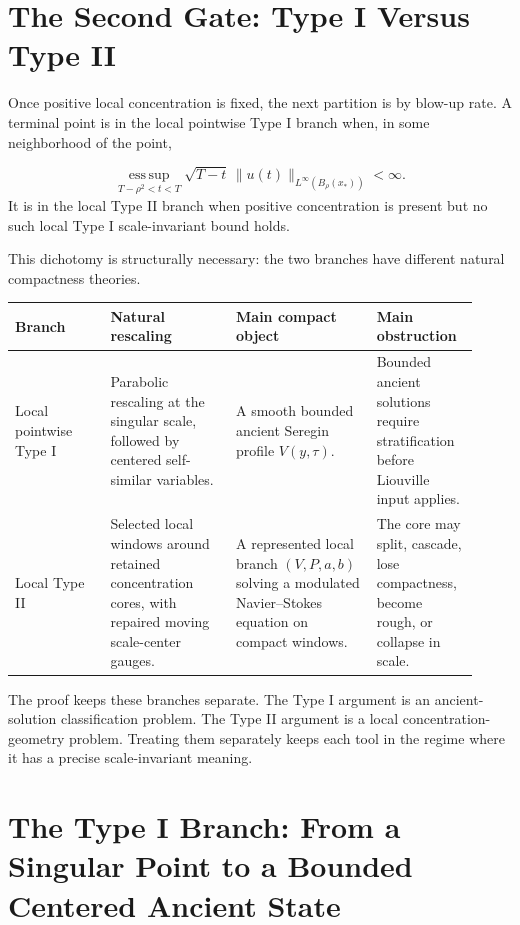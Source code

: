 \documentclass[11pt]{amsart}
\begin{document}
\section{The Second Gate: Type I Versus Type II}

Once positive local concentration is fixed, the next partition is by blow-up rate.  A terminal point is in the local pointwise Type I branch when, in some neighborhood of the point,

\[
  \operatorname*{ess\,sup}_{T-\rho^2<t<T}
  \sqrt{T-t}\,\|u(t)\|_{L^\infty(B_\rho(x_*))}<\infty .
\]
It is in the local Type II branch when positive concentration is present but no such local Type I scale-invariant bound holds.

This dichotomy is structurally necessary: the two branches have different natural compactness theories.

\begin{longtable}{@{}>{\raggedright\arraybackslash}p{0.19\linewidth}>{\raggedright\arraybackslash}p{0.25\linewidth}>{\raggedright\arraybackslash}p{0.28\linewidth}>{\raggedright\arraybackslash}p{0.20\linewidth}@{}}
\toprule
\textbf{Branch} & \textbf{Natural rescaling} & \textbf{Main compact object} & \textbf{Main obstruction} \\
\midrule
\endhead
Local pointwise Type I & Parabolic rescaling at the singular scale, followed by centered self-similar variables. & A smooth bounded ancient Seregin profile \(V(y,\tau)\). & Bounded ancient solutions require stratification before Liouville input applies. \\
Local Type II & Selected local windows around retained concentration cores, with repaired moving scale-center gauges. & A represented local branch \((V,P,a,b)\) solving a modulated Navier--Stokes equation on compact windows. & The core may split, cascade, lose compactness, become rough, or collapse in scale. \\
\bottomrule
\end{longtable}

The proof keeps these branches separate.  The Type I argument is an ancient-solution classification problem.  The Type II argument is a local concentration-geometry problem.  Treating them separately keeps each tool in the regime where it has a precise scale-invariant meaning.

\section{The Type I Branch: From a Singular Point to a Bounded Centered Ancient State}
\end{document}
